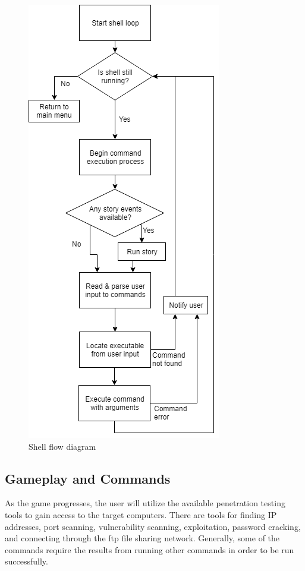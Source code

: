 \documentclass[conference]{IEEEtran}
\begin{document}
\begin{figure}[h]
    \centerline{\includegraphics[scale=0.7]{shellloop.png}}
    \caption{Shell flow diagram}
    \label{fig:shell-flow}
\end{figure}

\subsection{Gameplay and Commands}
As the game progresses, the user will utilize the available penetration testing tools to gain access to the target computers. There are tools for finding IP addresses, port scanning, vulnerability scanning, exploitation, password cracking, and connecting through the ftp file sharing network. Generally, some of the commands require the results from running other commands in order to be run successfully. 
\end{document}
